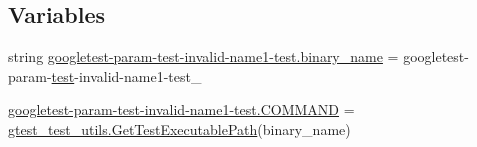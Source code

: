 \subsection*{Variables}
\begin{DoxyCompactItemize}
\item 
string \mbox{\hyperlink{namespacegoogletest-param-test-invalid-name1-test_a073018906c94da733e54cf4c457bec29}{googletest-\/param-\/test-\/invalid-\/name1-\/test.\+binary\+\_\+name}} = \textquotesingle{}googletest-\/param-\/\mbox{\hyperlink{_mutual_8h_a707ee03719e99670bf6cfdfd897b8456}{test}}-\/invalid-\/name1-\/test\+\_\+\textquotesingle{}
\item 
\mbox{\hyperlink{namespacegoogletest-param-test-invalid-name1-test_a92131bc06f98ffc4aa4a6effd87da6fd}{googletest-\/param-\/test-\/invalid-\/name1-\/test.\+C\+O\+M\+M\+A\+ND}} = \mbox{\hyperlink{namespacegtest__test__utils_a89ed3717984a80ffbb7a9c92f71b86a2}{gtest\+\_\+test\+\_\+utils.\+Get\+Test\+Executable\+Path}}(binary\+\_\+name)
\end{DoxyCompactItemize}
